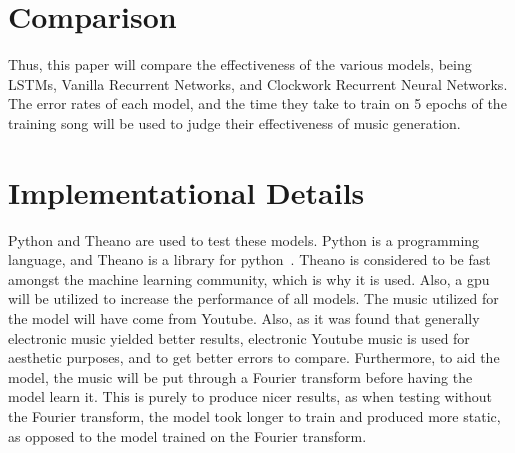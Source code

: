\documentclass[12pt, titlepage]{article}
\begin{document}


\section{Comparison}
Thus, this paper will compare the effectiveness of the various models, being
LSTMs, Vanilla Recurrent Networks, and Clockwork Recurrent Neural Networks. The
error rates of each model, and the time they take to train on 5 epochs of the
training song will be used to judge their effectiveness of music generation.


\section{Implementational Details}
Python and Theano are used to test these models. Python is a programming
language, and Theano is a library for python~\cite{theano}. Theano is considered
to be fast amongst the machine learning community, which is why it is used.
Also, a gpu will be utilized to increase the performance of all models. The
music utilized for the model will have come from Youtube. Also, as it was found
that generally electronic music yielded better results, electronic Youtube music
is used for aesthetic purposes, and to get better errors to compare.
Furthermore, to aid the model, the music will be put through a Fourier transform
before having the model learn it. This is purely to produce nicer results, as
when testing without the Fourier transform, the model took longer to train and
produced more static, as opposed to the model trained on the Fourier transform.
\end{document}
